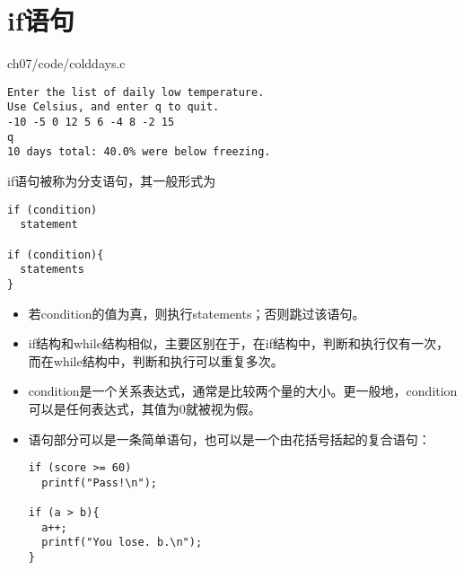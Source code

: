\section{if语句}

\begin{frame}\ft{\secname}

{ch07/code/colddays.c}
\end{frame}


\begin{frame}[fragile]\ft{\secname}
\begin{lstlisting}
Enter the list of daily low temperature.
Use Celsius, and enter q to quit.
-10 -5 0 12 5 6 -4 8 -2 15
q
10 days total: 40.0% were below freezing.
\end{lstlisting}
\end{frame}

\begin{frame}[fragile]\ft{\secname}
if语句被称为分支语句，其一般形式为
\begin{lstlisting}
if (condition)
  statement
  
if (condition){
  statements
}  
\end{lstlisting}
\begin{itemize}
\item
若condition的值为真，则执行statements；否则跳过该语句。\\[0.1in]
\item
if结构和while结构相似，主要区别在于，在if结构中，判断和执行仅有一次，而在while结构中，判断和执行可以重复多次。
\end{itemize}
\end{frame}

\begin{frame}[fragile]\ft{\secname}
\begin{itemize}
\item
condition是一个关系表达式，通常是比较两个量的大小。更一般地，condition可以是任何表达式，其值为0就被视为假。\\[0.1in]
\item
语句部分可以是一条简单语句，也可以是一个由花括号括起的复合语句：
\begin{lstlisting}
if (score >= 60)
  printf("Pass!\n");
  
if (a > b){
  a++;
  printf("You lose. b.\n");
}  
\end{lstlisting}
\end{itemize}

\end{frame}
